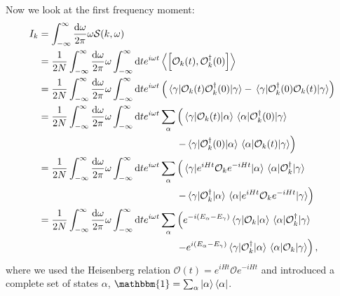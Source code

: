 \documentclass[11pt, a4paper]{report} %
\begin{document}
Now we look at the first frequency moment:
\begin{align}
  I_k &= \int_{-\infty}^{\infty}\frac{\dd \omega}{2\pi} \omega \mathcal{S}(k,\omega)\\
  &= \frac{1}{2N} \int_{-\infty}^{\infty}\frac{\dd \omega}{2\pi} \omega \int_{-\infty}^{\infty} \dd t e^{i\omega t} \expval{\qty[\mathcal{O}_k(t),\mathcal{O}_{k}^{\dagger}(0)]}\\
&= \frac{1}{2N} \int_{-\infty}^{\infty}\frac{\dd \omega}{2\pi} \omega \int_{-\infty}^{\infty} \dd t e^{i\omega t} \left(\matrixel{\gamma}{\mathcal{O}_k(t)\mathcal{O}_{k}^{\dagger}(0)}{\gamma} - \matrixel{\gamma}{\mathcal{O}_{k}^{\dagger}(0)\mathcal{O}_k(t)}{\gamma}\right) \\
&= \frac{1}{2N} \int_{-\infty}^{\infty}\frac{\dd \omega}{2\pi} \omega \int_{-\infty}^{\infty} \dd t e^{i\omega t} \sum_{\alpha} \left(\matrixel{\gamma}{\mathcal{O}_k(t)}{\alpha}\matrixel{\alpha}{\mathcal{O}_{k}^{\dagger}(0)}{\gamma} \right.\nonumber\\
&\qquad\qquad\qquad\qquad\qquad\qquad\qquad\left.- \matrixel{\gamma}{\mathcal{O}_{k}^{\dagger}(0)}{\alpha}\matrixel{\alpha}{\mathcal{O}_k(t)}{\gamma}\right)\\
&= \frac{1}{2N} \int_{-\infty}^{\infty}\frac{\dd \omega}{2\pi} \omega \int_{-\infty}^{\infty} \dd t e^{i\omega t} \sum_{\alpha} \left(\matrixel{\gamma}{e^{iHt}\mathcal{O}_k e^{-iHt}}{\alpha}\matrixel{\alpha}{\mathcal{O}_{k}^{\dagger}}{\gamma} \right.\nonumber\\
&\qquad\qquad\qquad\qquad\qquad\qquad\qquad\left.- \matrixel{\gamma}{\mathcal{O}_{k}^{\dagger}}{\alpha}\matrixel{\alpha}{e^{iHt}\mathcal{O}_k e^{-iHt}}{\gamma}\right)\\
&= \frac{1}{2N} \int_{-\infty}^{\infty}\frac{\dd \omega}{2\pi} \omega \int_{-\infty}^{\infty} \dd t e^{i\omega t} \sum_{\alpha} \left(e^{-i\qty(E_{\alpha}-E_{\gamma})}\matrixel{\gamma}{\mathcal{O}_k}{\alpha}\matrixel{\alpha}{\mathcal{O}_{k}^{\dagger}}{\gamma} \right.\nonumber\\ 
&\qquad\qquad\qquad\qquad\qquad\qquad\qquad\left.- e^{i\qty(E_{\alpha}-E_{\gamma})}\matrixel{\gamma}{\mathcal{O}_{k}^{\dagger}}{\alpha}\matrixel{\alpha}{\mathcal{O}_k}{\gamma}\right), \label{eq:fourierfreqmoment}
\end{align}
where we used the Heisenberg relation \(\mathcal{O}(t) = e^{iHt}\mathcal{O}e^{-iHt}\) and introduced a complete set of states \(\alpha\), \(\mathbbm{1}=\sum_{\alpha}\ket{\alpha}\bra{\alpha}\).
\end{document}
